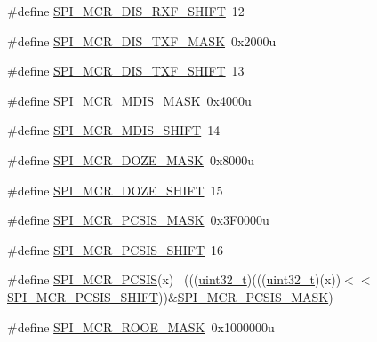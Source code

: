 \begin{DoxyCompactItemize}
\#define \hyperlink{group___s_p_i___register___masks_gaea17770537c6e387ed266e662f5e9d49}{S\+P\+I\+\_\+\+M\+C\+R\+\_\+\+D\+I\+S\+\_\+\+R\+X\+F\+\_\+\+S\+H\+I\+FT}~12
\item 
\#define \hyperlink{group___s_p_i___register___masks_gaa8bb3e6a285a70d51f3e637c2a29a41e}{S\+P\+I\+\_\+\+M\+C\+R\+\_\+\+D\+I\+S\+\_\+\+T\+X\+F\+\_\+\+M\+A\+SK}~0x2000u
\item 
\#define \hyperlink{group___s_p_i___register___masks_ga66fb6e165076aac7d60e416ed0950067}{S\+P\+I\+\_\+\+M\+C\+R\+\_\+\+D\+I\+S\+\_\+\+T\+X\+F\+\_\+\+S\+H\+I\+FT}~13
\item 
\#define \hyperlink{group___s_p_i___register___masks_gad6230b186a0f86d3b06973a0abad85d3}{S\+P\+I\+\_\+\+M\+C\+R\+\_\+\+M\+D\+I\+S\+\_\+\+M\+A\+SK}~0x4000u
\item 
\#define \hyperlink{group___s_p_i___register___masks_gad71aeecbfd5ab69825143fb055ae3e2b}{S\+P\+I\+\_\+\+M\+C\+R\+\_\+\+M\+D\+I\+S\+\_\+\+S\+H\+I\+FT}~14
\item 
\#define \hyperlink{group___s_p_i___register___masks_ga1f301c07deb8544d117e752400e0e537}{S\+P\+I\+\_\+\+M\+C\+R\+\_\+\+D\+O\+Z\+E\+\_\+\+M\+A\+SK}~0x8000u
\item 
\#define \hyperlink{group___s_p_i___register___masks_gab24077f2090f26468c4ebe2ecfda7c5f}{S\+P\+I\+\_\+\+M\+C\+R\+\_\+\+D\+O\+Z\+E\+\_\+\+S\+H\+I\+FT}~15
\item 
\#define \hyperlink{group___s_p_i___register___masks_ga69de8a51e829efc59b2a2402a8210aeb}{S\+P\+I\+\_\+\+M\+C\+R\+\_\+\+P\+C\+S\+I\+S\+\_\+\+M\+A\+SK}~0x3\+F0000u
\item 
\#define \hyperlink{group___s_p_i___register___masks_ga5130ba4524baa3be71b17af17b06b3e2}{S\+P\+I\+\_\+\+M\+C\+R\+\_\+\+P\+C\+S\+I\+S\+\_\+\+S\+H\+I\+FT}~16
\item 
\#define \hyperlink{group___s_p_i___register___masks_ga4d1101a8f8d3f7a06ab1f05adddbc530}{S\+P\+I\+\_\+\+M\+C\+R\+\_\+\+P\+C\+S\+IS}(x)                                              ~(((\hyperlink{_p_e___types_8h_a33594304e786b158f3fb30289278f5af}{uint32\+\_\+t})(((\hyperlink{_p_e___types_8h_a33594304e786b158f3fb30289278f5af}{uint32\+\_\+t})(x))$<$$<$\hyperlink{group___s_p_i___register___masks_ga5130ba4524baa3be71b17af17b06b3e2}{S\+P\+I\+\_\+\+M\+C\+R\+\_\+\+P\+C\+S\+I\+S\+\_\+\+S\+H\+I\+FT}))\&\hyperlink{group___s_p_i___register___masks_ga69de8a51e829efc59b2a2402a8210aeb}{S\+P\+I\+\_\+\+M\+C\+R\+\_\+\+P\+C\+S\+I\+S\+\_\+\+M\+A\+SK})
\item 
\#define \hyperlink{group___s_p_i___register___masks_ga2f3c41dcffc0058ae83ae7b1dbfffd86}{S\+P\+I\+\_\+\+M\+C\+R\+\_\+\+R\+O\+O\+E\+\_\+\+M\+A\+SK}~0x1000000u
$$
\end{DoxyCompactItemize}
